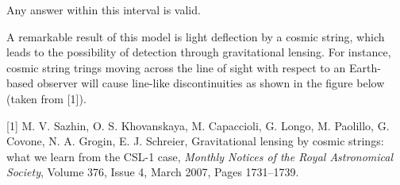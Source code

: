 \begin{description}
  Any answer within this interval is valid.

  A remarkable result of this model is light deflection by a cosmic
  string, which leads to the possibility of detection through
  gravitational lensing. For instance, cosmic string trings moving across
  the line of sight with respect to an Earth-based observer will cause
  line-like discontinuities as shown in the figure below (taken from
  [1]).

  [1] M. V. Sazhin, O. S. Khovanskaya, M. Capaccioli, G. Longo,
  M. Paolillo, G. Covone, N. A. Grogin, E. J. Schreier, Gravitational
  lensing by cosmic strings: what we learn from the CSL-1 case,
  \emph{Monthly Notices of the Royal Astronomical Society}, Volume 376,
  Issue 4, March 2007, Pages 1731--1739.
\end{description}

